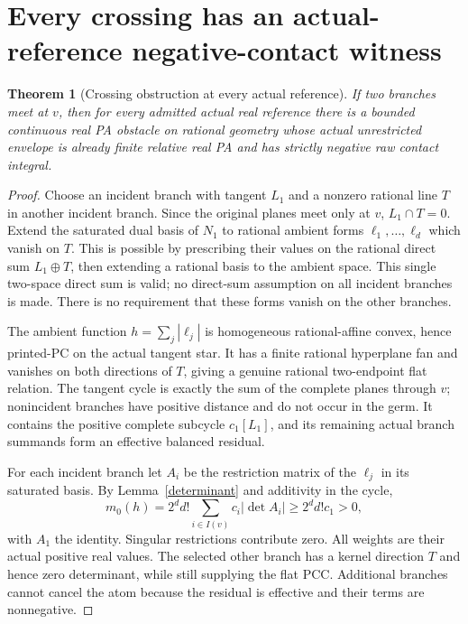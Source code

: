 \documentclass[11pt]{article}
\newtheorem{theorem}{Theorem}
\begin{document}
\section{Every crossing has an actual-reference negative-contact witness}\label{jets}
\begin{theorem}[Crossing obstruction at every actual reference]\label{contact}
If two branches meet at $v$, then for every admitted actual real reference there is a bounded continuous real PA obstacle on rational geometry whose actual unrestricted envelope is already finite relative real PA and has strictly negative raw contact integral.
\end{theorem}
\begin{proof}
Choose an incident branch with tangent $L_1$ and a nonzero rational line $T$ in another incident branch. Since the original planes meet only at $v$, $L_1\cap T=0$. Extend the saturated dual basis of $N_1$ to rational ambient forms $\ell_1,\ldots,\ell_d$ which vanish on $T$. This is possible by prescribing their values on the rational direct sum $L_1\oplus T$, then extending a rational basis to the ambient space. This single two-space direct sum is valid; no direct-sum assumption on all incident branches is made. There is no requirement that these forms vanish on the other branches.

The ambient function $h=\sum_j|\ell_j|$ is homogeneous rational-affine convex, hence printed-PC on the actual tangent star. It has a finite rational hyperplane fan and vanishes on both directions of $T$, giving a genuine rational two-endpoint flat relation. The tangent cycle is exactly the sum of the complete planes through $v$; nonincident branches have positive distance and do not occur in the germ. It contains the positive complete subcycle $c_1[L_1]$, and its remaining actual branch summands form an effective balanced residual.

For each incident branch let $A_i$ be the restriction matrix of the $\ell_j$ in its saturated basis. By Lemma~\ref{determinant} and additivity in the cycle,
\[
 m_0(h)=2^d d!\sum_{i\in I(v)}c_i|\det A_i|
       \geq2^d d!c_1>0,
\]
with $A_1$ the identity. Singular restrictions contribute zero. All weights are their actual positive real values. The selected other branch has a kernel direction $T$ and hence zero determinant, while still supplying the flat PCC. Additional branches cannot cancel the atom because the residual is effective and their terms are nonnegative.


\end{proof}
\end{document}
